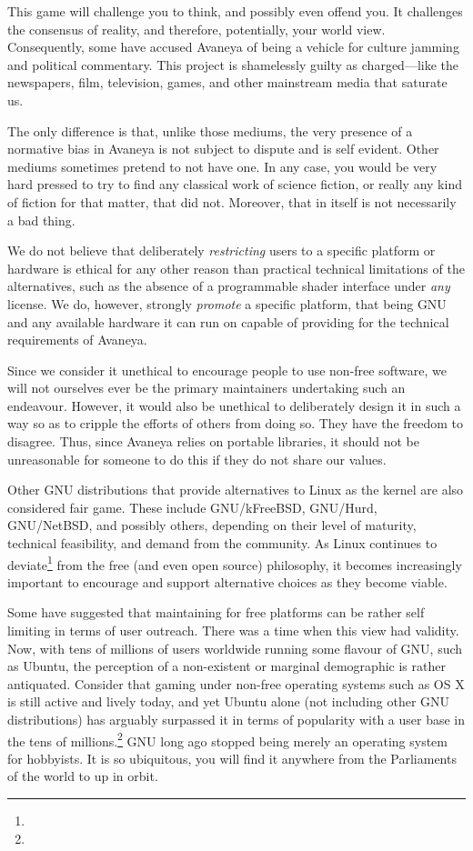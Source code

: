 This game will challenge you to think, and possibly even offend you. It challenges the consensus of reality, and therefore, potentially, your world view. Consequently, some have accused Avaneya of being a vehicle for culture jamming and political commentary. This project is shamelessly guilty as charged---like the newspapers, film, television, games, and other mainstream media that saturate us. 

The only difference is that, unlike those mediums, the very presence of a normative bias in Avaneya is not subject to dispute and is self evident. Other mediums sometimes pretend to not have one. In any case, you would be very hard pressed to try to find any classical work of science fiction, or really any kind of fiction for that matter, that did not. Moreover, that in itself is not necessarily a bad thing.

We do not believe that deliberately {\it restricting} users to a specific platform or hardware is ethical for any other reason than practical technical limitations of the alternatives, such as the absence of a programmable shader interface under {\it any} license. We do, however, strongly {\it promote} a specific platform, that being GNU and any available hardware it can run on capable of providing for the technical requirements of Avaneya.

Since we consider it unethical to encourage people to use non-free software, we will not ourselves ever be the primary maintainers undertaking such an endeavour. However, it would also be unethical to deliberately design it in such a way so as to cripple the efforts of others from doing so. They have the freedom to disagree. Thus, since Avaneya relies on portable libraries, it should not be unreasonable for someone to do this if they do not share our values.

Other GNU distributions that provide alternatives to Linux as the kernel are also considered fair game. These include GNU/kFreeBSD, GNU/Hurd, GNU/NetBSD, and possibly others, depending on their level of maturity, technical feasibility, and demand from the community. As Linux continues to deviate\footnote{} from the free (and even open source) philosophy, it becomes increasingly important to encourage and support alternative choices as they become viable.

Some have suggested that maintaining for free platforms can be rather self limiting in terms of user outreach. There was a time when this view had validity. Now, with tens of millions of users worldwide running some flavour of GNU, such as Ubuntu, the perception of a non-existent or marginal demographic  is rather antiquated. Consider that gaming under non-free operating systems such as OS X is still active and lively today, and yet Ubuntu alone (not including other GNU distributions) has arguably surpassed it in terms of popularity with a user base in the tens of millions.\footnote{} GNU long ago stopped being merely an operating system for hobbyists. It is so ubiquitous, you will find it anywhere from the Parliaments of the world to up in orbit.

\StopChapter

